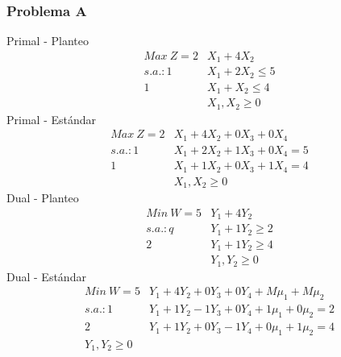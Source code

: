 \begin{homeworkProblem}
\subsubsection{Problema A}
Primal - Planteo
\begin{align*}
Max\ Z = 2&X_1 + 4X_2 \\
s.a.: 1&X_1 + 2X_2 \le 5 \\
1&X_1 + X_2 \le 4 \\
&X_1,X_2 \ge 0
\end{align*}
Primal - Estándar
\begin{align*}
Max\ Z = 2&X_1 + 4X_2 + 0X_3 + 0X_4 \\
s.a.:1&X_1 + 2X_2 + 1X_3 + 0X_4 = 5 \\
1&X_1 + 1X_2 + 0X_3 + 1X_4 = 4 \\
&X_1,X_2 \ge 0
\end{align*}
Dual - Planteo
\begin{align*}
Min\ W = 5&Y_1 + 4Y_2 \\
s.a.:q&Y_1 + 1Y_2 \ge 2 \\
2&Y_1 + 1Y_2 \ge 4\\
&Y_1,Y_2 \ge 0
\end{align*}
Dual - Estándar
\begin{align*}
Min\ W = 5&Y_1 + 4Y_2 + 0Y_3 + 0Y_4 + M\mu_1 + M\mu_2 \\
s.a.: 1&Y_1 + 1Y_2 - 1Y_3 +0Y_4 + 1\mu_1 + 0\mu_2 = 2 \\
2&Y_1 + 1Y_2 + 0Y_3 - 1Y_4 + 0\mu_1 + 1\mu_2 = 4\\
Y_1,Y_2 \ge 0
\end{align*}


\end{homeworkProblem}
